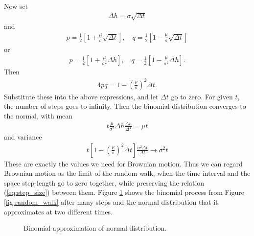 \documentclass[\topdir/lecture\_notes.tex]{subfiles}
\begin{document}
Now set
\begin{align}
\Delta h=\sigma \sqrt{\Delta t} \label{eq:step_size}
\end{align}
and
\begin{align}
p=\frac{1}{2}\left[1+\frac{\mu}{\sigma} \sqrt{\Delta t}\right], \quad q=\frac{1}{2}\left[1-\frac{\mu}{\sigma} \sqrt{\Delta t}\right]
\end{align}
or
\begin{align}
p=\frac{1}{2}\left[1+\frac{\mu}{\sigma^{2}} \Delta h\right], \quad q=\frac{1}{2}\left[1-\frac{\mu}{\sigma^{2}} \Delta h\right]. 
\end{align}
Then
\begin{align*}
4 p q=1-\left(\frac{\mu}{\sigma}\right)^{2} \Delta t.
\end{align*}
Substitute these into the above expressions, and let \(\Delta t\) go to zero. For given \(t\), the number of steps goes to infinity. Then the binomial distribution converges to the normal, with mean
\begin{align*}
t \frac{\mu}{\sigma^{2}} \Delta h \frac{\Delta h}{\Delta t}=\mu t
\end{align*}
and variance
\begin{align*}
t\left[1-\left(\frac{\mu}{\sigma}\right)^{2} \Delta t\right] \frac{\sigma^{2} \Delta t}{\Delta t} \rightarrow \sigma^{2} t
\end{align*}
These are exactly the values we need for Brownian motion. Thus we can regard Brownian motion as the limit of the random walk, when the time interval and the space step-length go to zero together, while preserving the relation (\ref{eq:step_size}) between them.
Figure \ref{fig:binomial_normal} shows the binomial process from Figure \ref{fig:random_walk} after many steps and the normal distribution that it approximates at two different times.
\begin{figure}
    \centering
{}
\caption{Binomial approximation of normal distribution.}\label{fig:binomial_normal}
\end{figure}
\end{document}
